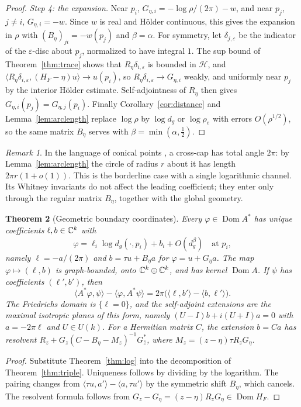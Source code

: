 \documentclass[11pt]{article}
\newtheorem{theorem}{Theorem}[section]
\theoremstyle{definition}\newtheorem{definition}[theorem]{Definition}
\theoremstyle{remark}\newtheorem{remark}[theorem]{Remark}
\newcommand{\Dom}{\operatorname{Dom}}\newcommand{\dd}{\,d}
\newcommand{\cH}{\mathcal H}\newcommand{\cV}{\mathcal V}\newcommand{\inte}{\operatorname{int}}
\begin{document}
\begin{proof}
\emph{Step 4: the expansion.} Near $p_i$, $G_{\eta,i}=-\log\rho/(2\pi)-w$, and
near $p_j$, $j\neq i$, $G_{\eta,i}=-w$. Since $w$ is real and H\"older
continuous, this gives the expansion in $\rho$ with $(B_\eta)_{ji}=-w(p_j)$ and
$\beta=\alpha$. For symmetry, let $\delta_{j,\varepsilon}$ be the indicator of
the $\varepsilon$-disc about $p_j$, normalized to have integral $1$. The sup
bound of Theorem~\ref{thm:trace} shows that $R_\eta\delta_{i,\varepsilon}$ is
bounded in $\cH$, and
$\langle R_\eta\delta_{i,\varepsilon},(H_F-\eta)u\rangle\to u(p_i)$, so
$R_\eta\delta_{i,\varepsilon}\to G_{\eta,i}$ weakly, and uniformly near $p_j$ by
the interior H\"older estimate. Self-adjointness of $R_\eta$ then gives
$G_{\eta,i}(p_j)=G_{\eta,j}(p_i)$. Finally Corollary~\ref{cor:distance} and
Lemma~\ref{lem:arclength} replace $\log\rho$ by $\log d_g$ or $\log\rho_e$ with
errors $O(\rho^{1/2})$, so the same matrix $B_\eta$ serves with
$\beta=\min(\alpha,\frac12)$.
\end{proof}

\begin{remark}\label{rem:angle}
In the language of conical points \cite{hk}, a cross-cap has total angle
$2\pi$: by Lemma~\ref{lem:arclength} the circle of radius $r$ about it has
length $2\pi r(1+o(1))$. This is the borderline case with a single logarithmic
channel. Its Whitney
invariants do not affect the leading coefficient; they enter only through the
regular matrix $B_\eta$, together with the global geometry.
\end{remark}

\begin{theorem}[Geometric boundary coordinates]\label{thm:boundary}
Every $\varphi\in\Dom A^*$ has unique coefficients $\ell,b\in\mathbb C^k$ with
\[
 \varphi=\ell_i\log d_g(\cdot,p_i)+b_i+O(d_g^\beta)\quad\text{at }p_i,
\]
namely $\ell=-a/(2\pi)$ and $b=\tau u+B_\eta a$ for $\varphi=u+G_\eta a$. The map
$\varphi\mapsto(\ell,b)$ is graph-bounded, onto $\mathbb C^k\oplus\mathbb C^k$, and has kernel
$\Dom A$. If $\psi$ has coefficients $(\ell',b')$, then
\[
 \langle A^*\varphi,\psi\rangle-\langle \varphi,A^*\psi\rangle=2\pi\bigl(\langle\ell,b'\rangle-\langle b,\ell'\rangle\bigr).
\]
The Friedrichs domain is $\{\ell=0\}$, and the self-adjoint extensions are the
maximal isotropic planes of this form, namely $(U-I)b+i(U+I)a=0$ with
$a=-2\pi\ell$ and $U\in U(k)$. For a Hermitian matrix $C$, the extension
$b=Ca$ has resolvent $R_z+G_z(C-B_\eta-M_z)^{-1}G_{\bar z}^*$, where
$M_z=(z-\eta)\tau R_zG_\eta$.
\end{theorem}
\begin{proof}
Substitute Theorem~\ref{thm:log} into the decomposition of
Theorem~\ref{thm:triple}. Uniqueness follows by dividing by the logarithm.
The pairing changes from $\langle\tau u,a'\rangle-\langle a,\tau u'\rangle$ by
the symmetric shift $B_\eta$, which cancels. The resolvent formula follows from
$G_z-G_\eta=(z-\eta)R_zG_\eta\in\Dom H_F$.
\end{proof}
\end{document}
